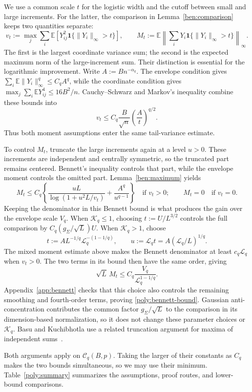 \documentclass[11pt,letterpaper]{article}
\theoremstyle{remark}
\newcommand{\E}{\mathbb E}
\newcommand{\ind}{\mathbf 1}
\begin{document}
We use a common scale $t$ for the logistic width and the cutoff
between small and large increments. For the latter, the comparison
in Lemma~\ref{ben:comparison} keeps two quantities separate:
\[
 v_t:=\max_j\sum_i\E[Y_{ij}^2\ind\{\|Y_i\|_\infty>t\}],
 \qquad
 M_t:=\E\left\|\sum_iY_i\ind\{\|Y_i\|_\infty>t\}\right\|_\infty.
\]
The first is the largest coordinate variance sum; the second is the
expected maximum norm of the large-increment sum. Their distinction
is essential for the logarithmic improvement.
Write $A:=Bn^{-\alpha_q}$. The envelope condition gives
$\sum_i\E\|Y_i\|_\infty^q\le C_qA^q$, while the coordinate
condition gives $\max_j\sum_i\E Y_{ij}^4\le16B^2/n$.
Cauchy--Schwarz and Markov's inequality combine these bounds into
\[
 v_t\le C_q\frac B{\sqrt n}\left(\frac At\right)^{q/2}.
\]
Thus both moment assumptions enter the same tail-variance estimate.

To control $M_t$, truncate the large increments again at a level
$u>0$. These increments are independent and centrally symmetric,
so the truncated part remains centered. Bennett's inequality
controls that part, while the envelope moment controls the omitted
part. Lemma~\ref{ben:maximum} yields
\[
 M_t\le C_q\left\{
       \frac{uL}{\log(1+u^2L/v_t)}+\frac{A^q}{u^{q-1}}\right\}
 \quad\text{if }v_t>0;
 \qquad M_t=0\quad\text{if }v_t=0.
\]
Keeping the denominator in this Bennett bound is what produces the
gain over the envelope scale $V_q$.
When $\mathcal K_q\le1$, choosing $t:=U/L^{3/2}$ controls the
full comparison by $C_q(g_\Sigma/\sqrt L)U$.
When $\mathcal K_q>1$, choose
\[
 t:=A L^{-1/q}\mathcal L_q^{-(1-1/q)},\qquad
 u:=\mathcal L_q t=A(\mathcal L_q/L)^{1/q}.
\]
The mixed moment estimate above makes the Bennett denominator at
least $c_q\mathcal L_q$ when $v_t>0$. The two terms in its bound
then have the same order, giving
\[
 \sqrt L\,M_t\le C_q\frac{V_q}{\mathcal L_q^{1-1/q}}.
\]
Appendix~\ref{app:bennett} checks that this choice also controls
the remaining smoothing and fourth-order terms, proving
\eqref{poly:bennett-bound}. Gaussian anti-concentration contributes
the common factor $g_\Sigma/\sqrt L$ to the comparison in its
dimension-based normalization, so it does not change these parameter
choices or $\mathcal K_q$.
Basu and Kuchibhotla use a related truncation argument for maxima
of independent sums~\cite[Proposition~4.2]{BK2025}.

Both arguments apply on $\mathcal C_q(B,p)$. Taking the larger of
their constants as $C_q$ makes the two bounds simultaneous, so we may
use their minimum. Table~\ref{poly:summary} summarizes the assumptions,
proof routes, and lower-bound comparisons.
\end{document}
